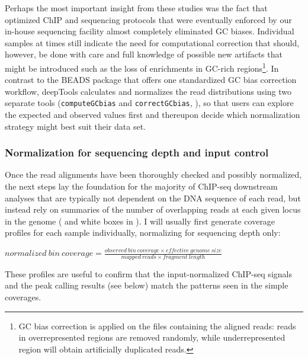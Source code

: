 Perhaps the most important insight from these studies was the fact that optimized ChIP and sequencing protocols that were eventually enforced by our in-house sequencing facility almost completely eliminated GC biases. Individual samples at times still indicate the need for computational correction that should, however, be done with care and full knowledge of possible new artifacts that might be introduced such as the loss of enrichments in GC-rich regions\footnote{GC bias correction is applied on the files containing the aligned reads: reads in overrepresented regions are removed randomly, while underrepresented region will obtain artificially duplicated reads.}. In contrast to the BEADS package \citep{Cheung2011} that offers one standardized GC bias correction workflow, deepTools calculates and normalizes the read distributions using two separate tools (\texttt{computeGCbias} and \texttt{correctGCbias}, ), so that users can explore the expected and observed values first and thereupon decide which normalization strategy might best suit their data set. 
%
\subsubsection{Normalization for sequencing depth and input control}
Once the read alignments have been thoroughly checked and possibly normalized, the next steps lay the foundation for the majority of ChIP-seq downstream analyses that are typically not dependent on the DNA sequence of each read, but instead rely on summaries of the number of overlapping reads at each given locus in the genome ( and white boxes in ).
I will usually first generate coverage profiles for each sample individually, normalizing for sequencing depth only:
\begin{center}
$normalized\:bin\:coverage = \frac{observed\:bin\:coverage \times e\!f\!\!f\!ective\:genome\:size}{mapped\:reads \times f\!ragment\:length}$\\
\end{center}
These profiles are useful to confirm that the input-normalized ChIP-seq signals and the peak calling results (see below) match the patterns seen in the simple coverages.

